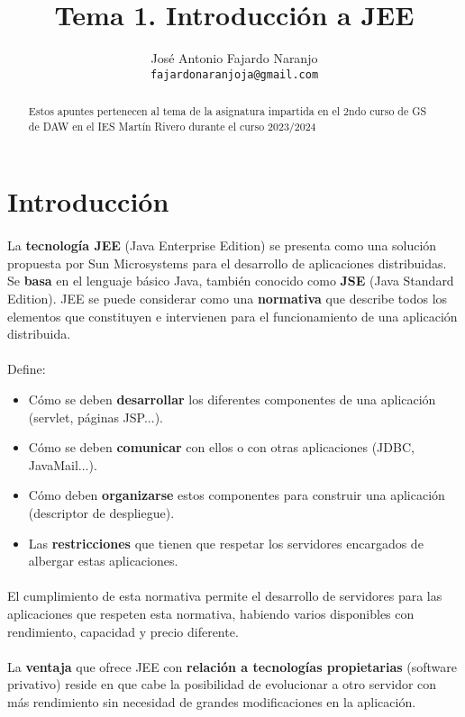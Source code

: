 \documentclass{article}
\title{Tema 1. Introducción a JEE}
\author{José Antonio Fajardo Naranjo \\
	\small
	\tt{fajardonaranjoja@gmail.com} \\
	\date{}
}
\begin{document}
	\maketitle
	\begin{abstract} 
		\noindent Estos apuntes pertenecen al tema de la asignatura impartida en el 2ndo curso de GS de DAW en el IES Martín Rivero durante el curso 2023/2024  \end{abstract}
	
	\tableofcontents
	\newpage{\ }
	\thispagestyle{empty}
	
	\section{Introducción}
	
	\paragraph{}La \textbf{tecnología JEE} (Java Enterprise Edition) se presenta como una solución propuesta por Sun Microsystems para el desarrollo de aplicaciones distribuidas. Se \textbf{basa} en el lenguaje básico Java, también conocido como \textbf{JSE} (Java Standard Edition). JEE se puede considerar como una \textbf{normativa} que describe todos los elementos que constituyen e intervienen para el funcionamiento de una aplicación distribuida.
	\\
	\\
	Define:
	\begin{itemize}
		\item Cómo se deben \textbf{desarrollar} los diferentes componentes de una aplicación (servlet, páginas JSP...).
		\item Cómo se deben \textbf{comunicar} con ellos o con otras aplicaciones (JDBC, JavaMail...).
		\item Cómo deben \textbf{organizarse} estos componentes para construir una aplicación (descriptor de despliegue).
		\item Las \textbf{restricciones} que tienen que respetar los servidores encargados de albergar estas aplicaciones.
	\end{itemize}
	\paragraph{}El cumplimiento de esta normativa permite el desarrollo de servidores para las aplicaciones que respeten esta normativa, habiendo varios disponibles con rendimiento, capacidad y precio diferente.
	\\
	\\
	La \textbf{ventaja} que ofrece JEE con \textbf{relación a tecnologías propietarias} (software privativo) reside en que cabe la posibilidad de evolucionar a otro servidor con más rendimiento sin necesidad de grandes modificaciones en la aplicación.
	
\end{document}
